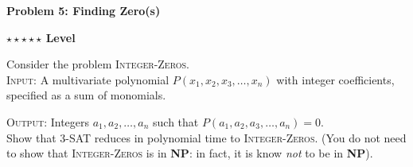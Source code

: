 \documentclass{article}\usepackage[utf8]{inputenc}\usepackage[margin=0.4cm,top=0.4cm,bottom=0.4cm]{geometry}\usepackage[usenames,dvipsnames,svgnames,table]{xcolor}
\begin{document}
\vspace{-2mm}\noindent\begin{mybox}{\begin{center}\textbf{\color{black}Problem 5: Finding Zero(s)}\end{center}}\end{mybox}\vspace{-2mm}
\begin{myboxot}\noindent\textbf{$\star\star\star\star\star$ Level}\end{myboxot} 

\noindent Consider the problem \textsc{Integer-Zeros}.\\

\noindent \textsc{Input}: A multivariate polynomial $P(x_1,x_2,x_3,\ldots,x_n)$ with integer coefficients, specified as a sum of monomials.

\noindent \textsc{Output}: Integers $a_1,a_2,\ldots,a_n$ such that $P(a_1,a_2,a_3,\ldots,a_n)=0$.\\

\noindent Show that 3-SAT reduces in polynomial time to \textsc{Integer-Zeros}. (You do not need to show that \textsc{Integer-Zeros} is in \textbf{NP}: in fact, it is know \textit{not} to be in \textbf{NP}).
\end{document}
